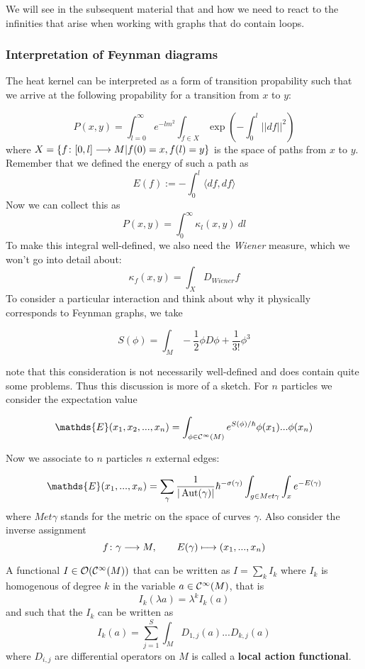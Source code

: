 We will see in the subsequent material that and how we need to react to the infinities that arise when working with graphs that do contain loops.


\subsubsection{Interpretation of Feynman diagrams}
\label{subsubsec:feynman_intepretation}

The heat kernel can be interpreted as a form of transition propability such that we arrive at the following propability for a transition from $x$ to $y$:

$$ P(x,y) = \int_{l=0}^\infty e^{-lm^2} \int_{f\in X}  \exp\left( - \int_0^l ||df||^2 \right)$$
where $X = \{f \colon [0,l] \longrightarrow M | f(0) = x, f(l) = y \}$ is the space of paths from $x$ to $y$. Remember that we defined the energy of such a path as
$$ E(f) := - \int_0^l \langle df, df \rangle $$
Now we can collect this as
$$ P(x,y) = \int_0^\infty \kappa_l(x,y) \ dl $$
To make this integral well-defined, we also need the \emph{Wiener} measure, which we won't go into detail about:
$$ \kappa_f (x,y) = \int_X D_{Wiener} f $$
To consider a particular interaction and think about why it physically corresponds to Feynman graphs, we take

$$ S(\phi) = \int_M - \frac{1}{2} \phi D\phi + \frac{1}{3!} \phi^3 $$

note that this consideration is not necessarily well-defined and does contain quite some problems. Thus this discussion is more of a sketch. For $n$ particles we consider the expectation value

$$ \mathds{E}(x_1, x_2, ..., x_n) = \int_{\phi \in \Ci(M)} e^{S(\phi)/\hbar} \phi(x_1) ... \phi(x_n) $$

Now we associate to $n$ particles $n$ external edges:

$$ \mathds{E}(x_1, ..., x_n) = \sum_\gamma \frac{1}{|\Aut(\gamma)|} \hbar^{-\sigma(\gamma)} \int_{g \in Met \gamma} \int_x e^{-E(\gamma)} $$
where $Met \gamma$ stands for the metric on the space of curves $\gamma$. Also consider the inverse assignment
$$ f \colon \gamma \longrightarrow M, \quad \quad E(\gamma) \longmapsto (x_1,...,x_n) $$

\begin{definition}
  A functional $I \in \mathcal{O}(\mathcal{C}^{\infty}(M))$ that can be written as $I = \sum_k I_k$ where $I_k$ is homogenous of degree $k$ in the variable $a \in \mathcal{C}^{\infty}(M)$, that is
  $$ I_k(\lambda a) = \lambda^k I_k(a) $$
  and such that the $I_k$ can be written as
  $$ I_k (a) = \sum_{j=1}^{S} \int_M D_{1,j} (a) ... D_{k,j} (a) $$
  where $D_{i,j}$ are differential operators on $M$ is called a \textbf{local action functional}.
\end{definition}

